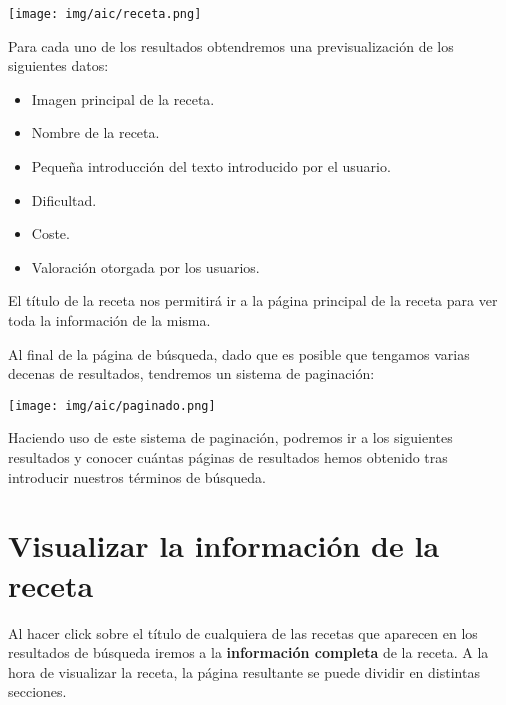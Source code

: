 \documentclass{\ClassPath/viu-tfm-template}
\begin{document}
\begin{center}
    \vspace{-10pt}
    \texttt{[image: img/aic/receta.png]}
    \vspace{-20pt}
\end{center}

Para cada uno de los resultados obtendremos una previsualización de los siguientes datos:

\vspace{-1em}
\begin{itemize}
    \item Imagen principal de la receta.
    \item Nombre de la receta.
    \item Pequeña introducción del texto introducido por el usuario.
    \item Dificultad.
    \item Coste.
    \item Valoración otorgada por los usuarios.
\end{itemize}
\vspace{-0.8em}

El título de la receta nos permitirá ir a la página principal de la receta para ver toda la información de la misma.

Al final de la página de búsqueda, dado que es posible que tengamos varias decenas de resultados, tendremos un sistema de paginación:

\begin{center}
    \vspace{-10pt}
    \texttt{[image: img/aic/paginado.png]}
    \vspace{-20pt}
\end{center}

Haciendo uso de este sistema de paginación, podremos ir a los siguientes resultados y conocer cuántas páginas de resultados hemos obtenido tras introducir nuestros términos de búsqueda.

\section{Visualizar la información de la receta}

Al  hacer click sobre el título de cualquiera de las recetas que aparecen en los resultados de búsqueda iremos a la \textbf{información completa} de la receta. A la hora de visualizar la receta, la página resultante se puede dividir en distintas secciones.
\end{document}
